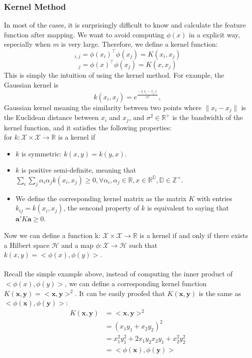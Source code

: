 \subsubsection{Kernel Method}
In most of the cases, it is surprisingly difficult to know and calculate the feature function after mapping. We want to avoid computing $\phi(x)$ in a explicit way, 
especially when $m$ is very large. Therefore, we define a kernel function:
\begin{equation*}
    [\Phi\Phi^\top]_{i,j}=\phi(x_i)^\top \phi(x_j)=K(x_i,x_j)
\end{equation*}
\begin{equation}
    [\phi(x)^\top\Phi^\top]_j=\phi(x)^\top\phi(x_j)=K(x,x_j)
\end{equation}
This is simply the intuition of using the kernel method. For example, the Gaussian kernel is
\begin{equation*}
    k(x_i, x_j) = e^\frac{-\parallel x_i - x_j \parallel}{\sigma^2},
\end{equation*}
Gaussian kernel meaning the similarity between two points where $\parallel x_i - x_j \parallel$ is the Euclidean distance between $x_i$ and $x_j$, and $\sigma^2 \in \mathbb{R}^+$ is the bandwidth of the kernel function, and it satisfies the 
following properties:\\
for $k: \mathcal{X} \times \mathcal{X} \rightarrow \mathbb{R}$ is a kernel if
\begin{itemize}
    \item $k$ is symmetric: $k(x,y) = k(y,x)$.
    \item $k$ is positive semi-definite, meaning that $\sum_{i} \sum_{j} \alpha_i \alpha_j k(x_i,x_j)\geq0, \forall \alpha_i, \alpha_j \in \mathbb{R}, x \in \mathbb{R}^\mathbb{D}, \mathbb{D} \in \mathbb{Z}^+$. 
    \item We define the corresponding kernel matrix as the matrix $K$ with entries $k_{ij}=k(x_i,x_j)$, the sencond property of $k$ is equivalent to saying that $\textbf{a}'K \textbf{a}\geq 0$.
\end{itemize}
Now we can define a function k: $\mathcal{X} \times \mathcal{X}  \rightarrow \mathbb{R}$ is a kernel if and 
only if there exists a Hilbert space $\mathcal{H}$ and a map $\phi: \mathcal{X}\rightarrow\mathcal{H}$ such that $k(x,y)=<\phi(x),\phi(y)>$. 
\\ \\
Recall the simple example above, instead of computing the inner product of $<\phi(x),\phi(y)>$, we can define 
a corresponding kernel function $K(\textbf{x},\textbf{y})=<\textbf{x},\textbf{y}>^2$. It can be easily proofed that $K(\textbf{x},\textbf{y})$ is the same as $<\phi(\textbf{x}),\phi(\textbf{y})>$:
\begin{align*}
    K(\textbf{x},\textbf{y})&=<\textbf{x},\textbf{y}>^2\\
                            &=(x_1y_1+x_2y_2)^2\\
                            &=x_1^2y_1^2+2x_1y_2x_2y_1+x_2^2y_2^2\\
                            &=<\phi(\textbf{x}),\phi(\textbf{y})>
\end{align*}

